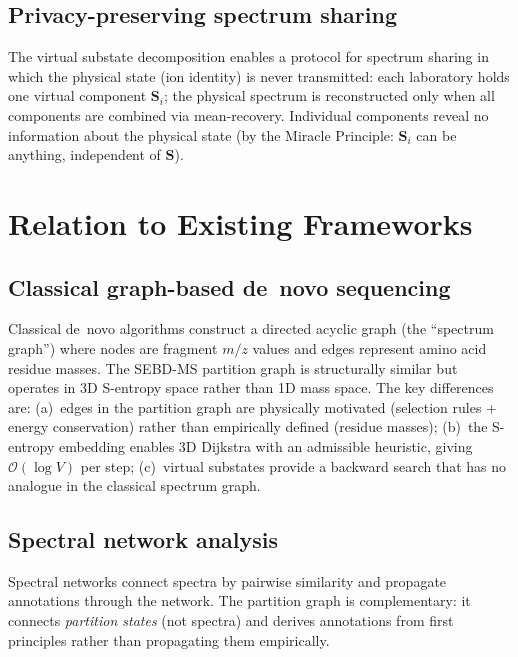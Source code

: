 \documentclass[twocolumn,10pt,a4paper]{article}
\theoremstyle{thmstyle}
\theoremstyle{definition}
\theoremstyle{remark}
\newcommand{\Sv}{\mathbf{S}}
\begin{document}
\subsection{Privacy-preserving spectrum sharing}

The virtual substate decomposition enables a protocol for spectrum sharing
in which the physical state (ion identity) is never transmitted:
each laboratory holds one virtual component $\Sv_i$; the physical
spectrum is reconstructed only when all components are combined via
mean-recovery. Individual components reveal no information about the
physical state (by the Miracle Principle: $\Sv_i$ can be anything,
independent of $\Sv$).

\section{Relation to Existing Frameworks}
\label{sec:relation}

\subsection{Classical graph-based de~novo sequencing}

Classical de~novo algorithms \citep{frank2005, ma2003} construct a
directed acyclic graph (the ``spectrum graph'') where nodes are fragment
$m/z$ values and edges represent amino acid residue masses. The SEBD-MS
partition graph is structurally similar but operates in 3D S-entropy
space rather than 1D mass space. The key differences are:
(a)~edges in the partition graph are physically motivated (selection
rules + energy conservation) rather than empirically defined (residue
masses); (b)~the S-entropy embedding enables 3D Dijkstra with an
admissible heuristic, giving $\mathcal{O}(\log V)$ per step;
(c)~virtual substates provide a backward search that has no analogue
in the classical spectrum graph.

\subsection{Spectral network analysis}

Spectral networks \citep{bandeira2007} connect spectra by pairwise
similarity and propagate annotations through the network. The partition
graph is complementary: it connects \emph{partition states} (not spectra)
and derives annotations from first principles rather than propagating
them empirically.
\end{document}
